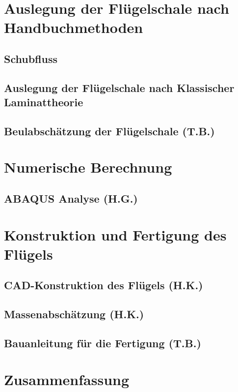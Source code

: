 \documentclass[a4paper,twoside,11pt]{article}
\begin{document}
\section{Auslegung der Flügelschale nach Handbuchmethoden}
\subsection{Schubfluss}

\newpage
\subsection{Auslegung der Flügelschale nach Klassischer Laminattheorie}

\newpage
\subsection{Beulabschätzung der Flügelschale (T.B.)}

\newpage
\section{Numerische Berechnung}\label{FEM}

\newpage
\subsection{ABAQUS Analyse (H.G.)}

\newpage
\section{Konstruktion und Fertigung des Flügels}
\subsection{CAD-Konstruktion des Flügels (H.K.)}\label{CAD}

\newpage
\subsection{Massenabschätzung (H.K.)}

\newpage
\subsection{Bauanleitung für die Fertigung (T.B.)}

\newpage
\section{Zusammenfassung}

\newpage
\end{document}
